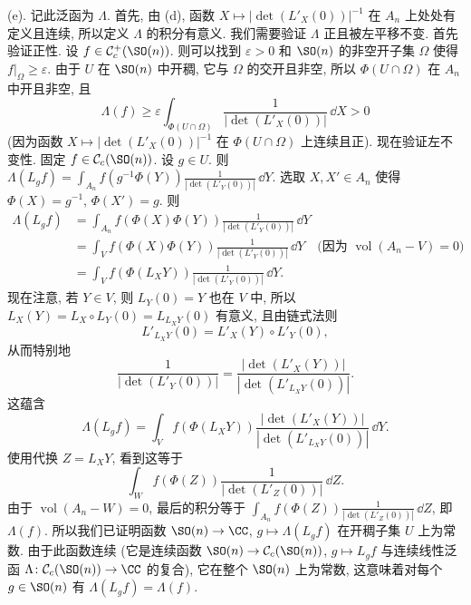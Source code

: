\begin{solution}
(e). 记此泛函为 $\Lambda$. 首先, 由 (d), 函数 $X \longmapsto |\det(L'_X(0))|^{-1}$ 在 $A_n$ 上处处有定义且连续, 所以定义 $\Lambda$ 的积分有意义.
我们需要验证 $\Lambda$ 正且被左平移不变. 首先验证正性. 设 $f \in \mathcal{C}_c^+(\SO(n))$. 则可以找到 $\varepsilon > 0$ 和 $\SO(n)$ 的非空开子集 $\Omega$ 使得 $f|_{\Omega} \geq \varepsilon$. 由于 $U$ 在 $\SO(n)$ 中开稠, 它与 $\Omega$ 的交开且非空, 所以 $\Phi(U \cap \Omega)$ 在 $A_n$ 中开且非空, 且
\[
\Lambda(f) \geq \varepsilon\int_{\Phi(U \cap \Omega)}\frac{1}{|\det(L'_X(0))|}\,\dd X > 0
\]
(因为函数 $X \longmapsto |\det(L'_X(0))|^{-1}$ 在 $\Phi(U \cap \Omega)$ 上连续且正).
现在验证左不变性. 固定 $f \in \mathcal{C}_c(\SO(n))$. 设 $g \in U$. 则 $\Lambda(L_gf) = \int_{A_n}f(g^{-1}\Phi(Y))\frac{1}{|\det(L'_Y(0))|}\,\dd Y$. 选取 $X, X' \in A_n$ 使得 $\Phi(X) = g^{-1}$, $\Phi(X') = g$. 则
\begin{align*}
\Lambda(L_gf) &= \int_{A_n}f(\Phi(X)\Phi(Y))\frac{1}{|\det(L'_Y(0))|}\,\dd Y \\
&= \int_V f(\Phi(X)\Phi(Y))\frac{1}{|\det(L'_Y(0))|}\,\dd Y \quad \text{(因为 } \operatorname{vol}(A_n - V) = 0\text{)} \\
&= \int_V f(\Phi(L_XY))\frac{1}{|\det(L'_Y(0))|}\,\dd Y.
\end{align*}
现在注意, 若 $Y \in V$, 则 $L_Y(0) = Y$ 也在 $V$ 中, 所以 $L_X(Y) = L_X \circ L_Y(0) = L_{L_XY}(0)$ 有意义, 且由链式法则
\[
L'_{L_XY}(0) = L'_X(Y) \circ L'_Y(0),
\]
从而特别地
\[
\frac{1}{|\det(L'_Y(0))|} = \frac{|\det(L'_X(Y))|}{|\det(L'_{L_XY}(0))|}.
\]
这蕴含
\[
\Lambda(L_gf) = \int_V f(\Phi(L_XY))\frac{|\det(L'_X(Y))|}{|\det(L'_{L_XY}(0))|}\,\dd Y.
\]
使用代换 $Z = L_XY$, 看到这等于
\[
\int_W f(\Phi(Z))\frac{1}{|\det(L'_Z(0))|}\,\dd Z.
\]
由于 $\operatorname{vol}(A_n - W) = 0$, 最后的积分等于 $\int_{A_n}f(\Phi(Z))\frac{1}{|\det(L'_Z(0))|}\,\dd Z$, 即 $\Lambda(f)$.
所以我们已证明函数 $\SO(n) \to \CC$, $g \longmapsto \Lambda(L_gf)$ 在开稠子集 $U$ 上为常数. 由于此函数连续 (它是连续函数 $\SO(n) \to \mathcal{C}_c(\SO(n))$, $g \longmapsto L_gf$ 与连续线性泛函 $\Lambda \colon \mathcal{C}_c(\SO(n)) \to \CC$ 的复合), 它在整个 $\SO(n)$ 上为常数, 这意味着对每个 $g \in \SO(n)$ 有 $\Lambda(L_gf) = \Lambda(f)$.
\end{solution}

